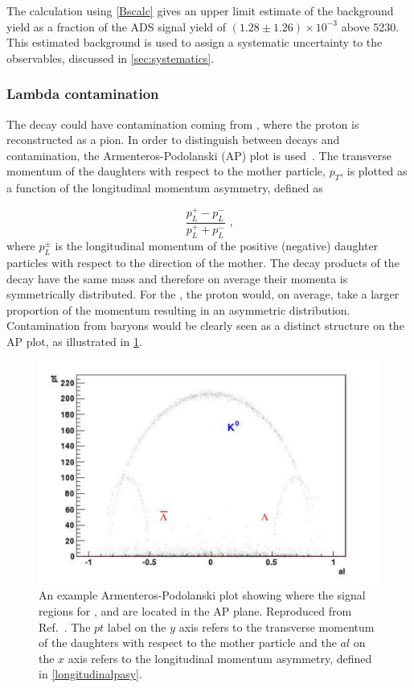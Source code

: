 The calculation using \eqn\ref{Bscalc} gives an upper limit estimate of the background yield as a fraction of the ADS signal yield of $(1.28 \pm 1.26) \times 10^{-3}$ above 5230\mev. This estimated \Bs background is used to assign a systematic uncertainty to the \CP observables, discussed in \sect\ref{sec:systematics}.


\subsubsection{Lambda contamination}
\label{sec:backgrounds:contamination}

The \decay{\KS}{\pip\pim} decay could have contamination coming from \decay{\Lz}{\proton\pim}, where the proton is reconstructed as a pion. In order to distinguish between \KS decays and \Lz contamination, the Armenteros-Podolanski (AP) plot is used~\cite{APplot}. The transverse momentum of the daughters with respect to the mother particle, $p_T$, is plotted as a function of the longitudinal momentum asymmetry, defined as

\begin{equation}
\frac{p_L^+ - p_L^-}{p_L^+ + p_L^-} \text{ ,}
\label{longitudinalpasy}
\end{equation}
where $p_L^{\pm}$ is the longitudinal momentum of the positive (negative) daughter particles with respect to the direction of the mother. The decay products of the \decay{\KS}{\pip\pim} decay have the same mass and therefore on average their momenta is symmetrically distributed. For the \decay{\Lz}{\proton\pim}, the proton would, on average, take a larger proportion of the momentum resulting in an asymmetric distribution. Contamination from \Lz baryons would be clearly seen as a distinct structure on the AP plot, as illustrated in \fig\ref{apexample}. 

\begin{figure}
\centering
\includegraphics[width=0.5\linewidth]{figures/backgrounds/APfromPaper.pdf}
\caption{An example Armenteros-Podolanski plot showing where the signal regions for \KS, \Lz and \Lbar are located in the AP plane. Reproduced from Ref.~\cite{APplot}. The $pt$ label on the $y$ axis refers to the transverse momentum of the daughters with respect to the mother particle and the $al$ on the $x$ axis refers to the longitudinal momentum asymmetry, defined in \eqn\ref{longitudinalpasy}.}
\label{apexample}
\end{figure}

